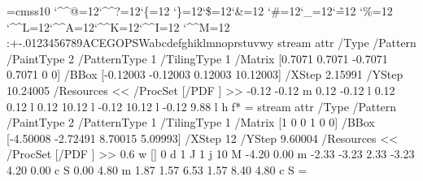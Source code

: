 \font\THFa=cmss10
\begingroup
\catcode`\^^@=12\catcode`\^^?=12\catcode`\{=12
\catcode`\}=12\catcode`\$=12\catcode`\&=12
\catcode`\#=12\catcode`\_=12\catcode`\~=12
\catcode`\%=12
\catcode`\^^L=12\catcode`\^^A=12\catcode`\^^K=12\catcode`\^^I=12
\catcode`\^^M=12
\THFa:+-.0123456789ACEGOPSWabcdefghiklmnoprstuvwy\endinclude\endgroup
\immediate\pdfobj stream attr {/Type /Pattern
/PaintType 2 /PatternType 1 /TilingType 1
/Matrix [0.7071 0.7071 -0.7071 0.7071 0 0]
/BBox [-0.12003 -0.12003 0.12003 10.12003]
/XStep 2.15991
/YStep 10.24005
/Resources << /ProcSet [/PDF ] >> } {
-0.12 -0.12 m
0.12 -0.12 l
0.12 0.12 l
0.12 10.12 l
-0.12 10.12 l
-0.12 9.88 l
h
f*
} \newcount \THPa\THPa=\pdflastobj
\immediate\pdfobj stream attr {/Type /Pattern
/PaintType 2 /PatternType 1 /TilingType 1
/Matrix [1 0 0 1 0 0]
/BBox [-4.50008 -2.72491 8.70015 5.09993]
/XStep 12
/YStep 9.60004
/Resources << /ProcSet [/PDF ] >> } {
0.6 w
[] 0 d
1 J
1 j
10 M
-4.20 0.00 m
-2.33 -3.23 2.33 -3.23 4.20 0.00 c
S
0.00 4.80 m
1.87 1.57 6.53 1.57 8.40 4.80 c
S
} \newcount \THPb\THPb=\pdflastobj
